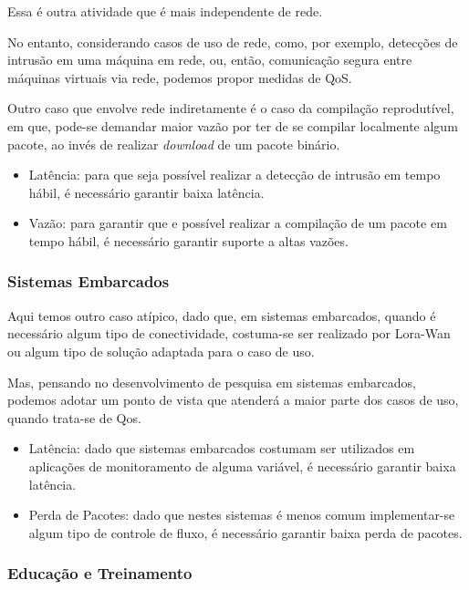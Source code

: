 Essa é outra atividade que é mais independente de rede.

No entanto, considerando casos de uso de rede, como, por exemplo,
detecções de intrusão em uma máquina em rede, ou, então, comunicação
segura entre máquinas virtuais via rede, podemos propor medidas de QoS.

Outro caso que envolve rede indiretamente é o caso da compilação reprodutível,
em que, pode\--se demandar maior vazão por ter de se compilar localmente
algum pacote, ao invés de realizar \textit{download} de um pacote binário.

\begin{itemize}
    \item Latência: para que seja possível realizar a detecção
        de intrusão em tempo hábil, é necessário garantir baixa latência.
    \item Vazão: para garantir que e possível realizar a compilação
        de um pacote em tempo hábil, é necessário garantir suporte
        a altas vazões.
\end{itemize}

\subsubsection{Sistemas Embarcados}

Aqui temos outro caso atípico, dado que, em sistemas embarcados, quando é necessário
algum tipo de conectividade, costuma\--se ser realizado por Lora\--Wan ou algum
tipo de solução adaptada para o caso de uso.

Mas, pensando no desenvolvimento de pesquisa em sistemas embarcados, podemos
adotar um ponto de vista que atenderá a maior parte dos casos de uso, quando
trata\--se de Qos.

\begin{itemize}
    \item Latência: dado que sistemas embarcados costumam ser utilizados em
        aplicações de monitoramento de alguma variável, é necessário garantir
        baixa latência.
    \item Perda de Pacotes: dado que nestes sistemas é menos comum implementar\--se
        algum tipo de controle de fluxo, é necessário garantir baixa perda de pacotes.
\end{itemize}

\subsubsection{Educação e Treinamento}


